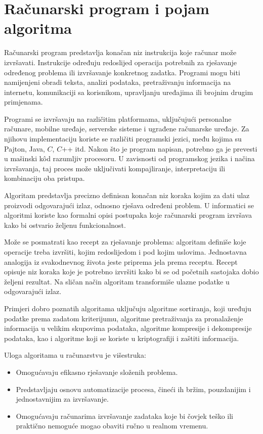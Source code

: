 \section{Računarski program i pojam algoritma}

Računarski program predstavlja konačan niz instrukcija koje računar može izvršavati. Instrukcije određuju redoslijed operacija potrebnih za rješa\-vanje određenog problema ili izvršavanje konkretnog zadatka. Programi mogu biti namijenjeni obradi teksta, analizi podataka, pretraživanju informacija na internetu, komunikaciji sa korisnikom, upravljanju uređajima ili brojnim drugim primjenama.

Programi se izvršavaju na različitim platformama, uključujući personalne računare, mobilne uređaje, serverske sisteme i ugrađene računarske uređaje. Za njihovu implementaciju koriste se različiti programski jezici, među kojima su Pajton, Java, $ C$, $ C$++ itd. Nakon što je program napisan, potrebno ga je prevesti u mašinski k\^od razumljiv procesoru. U zavisnosti od programskog jezika i načina izvršavanja, taj proces može uključivati kompajliranje, interpretaciju ili kombinaciju oba pristupa.

Algoritam predstavlja precizno definisan konačan niz koraka kojim za dati ulaz proizvodi odgovarajući izlaz, odnosno rješava određeni problem. U informatici se algoritmi koriste kao formalni opisi postupaka koje računarski program izvršava kako bi ostvario željenu funkcionalnost.

Može se posmatrati kao recept za rješavanje problema: algoritam definiše koje operacije treba izvršiti, kojim redoslijedom i pod kojim uslovima. Jednostavna analogija iz svakodnevnog života jeste priprema jela prema receptu. Recept opisuje niz koraka koje je potrebno izvršiti kako bi se od početnih sastojaka dobio željeni rezultat. Na sličan način algoritam transformiše ulazne podatke u odgovarajući izlaz.

Primjeri dobro poznatih algoritama uključuju algoritme sortiranja, koji uređuju podatke prema zadatom kriterijumu, algoritme pretraživanja za pronalaženje informacija u velikim skupovima podataka, algoritme kompresije i dekompresije podataka, kao i algoritme koji se koriste u kriptografiji i zaštiti informacija.

Uloga algoritama u računarstvu je višestruka:

\begin{itemize}
	\item Omogućavaju efikasno rješavanje složenih problema.
	\item Predstavljaju osnovu automatizacije procesa, čineći ih bržim, pouzdanijim i jednostavnijim za izvršavanje.
	\item Omogućavaju računarima izvršavanje zadataka koje bi čovjek teško ili praktično nemoguće mogao obaviti ručno u realnom vremenu.
\end{itemize}

